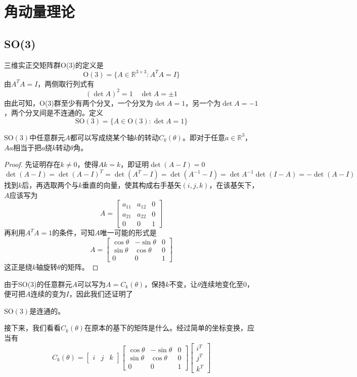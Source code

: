 \section{角动量理论}
\subsection{SO(3)}
三维实正交矩阵群O(3)的定义是
$$\mathrm{O}(3)=\{A\in\mathbb{R}^{3\times 3}:A^TA=I\}$$
由$A^TA=I$，两侧取行列式有
$$(\det A)^2=1\quad \det A=\pm 1$$
由此可知，O(3)群至少有两个分叉，一个分叉为$\det A=1$，另一个为$\det A=-1$，两个分叉间是不连通的。定义
$$\mathrm{SO}(3)=\{A\in\mathrm{O}(3):\det A=1\}$$
\begin{theorem}
    $\mathrm{SO}(3)$中任意群元$A$都可以写成绕某个轴$k$的转动$C_k(\theta)$。即对于任意$a\in\mathbb{R}^3$，$Aa$相当于把$a$绕$k$转动$\theta$角。
\end{theorem}
\begin{proof}
    先证明存在$k\neq 0$，使得$Ak=k$，即证明$\det(A-I)=0$
    $$\det(A-I)=\det(A-I)^T=\det(A^T-I)=\det(A^{-1}-I)=\det A^{-1}\det(I-A)=-\det(A-I)$$
    找到$k$后，再选取两个与$k$垂直的向量，使其构成右手基矢$(i,j,k)$，在该基矢下，$A$应该写为
    $$A=\left[\begin{array}{ccc}
        a_{11}&a_{12}&0\\
        a_{21}&a_{22}&0\\
        0&0&1
    \end{array}\right]$$
    再利用$A^TA=1$的条件，可知$A$唯一可能的形式是
    $$A=\left[\begin{array}{ccc}
        \cos\theta&-\sin\theta&0\\
        \sin\theta&\cos\theta&0\\
        0&0&1
    \end{array}\right]$$
    这正是绕$k$轴旋转$\theta$的矩阵。
\end{proof}
由于SO(3)的任意群元$A$可以写为$A=C_k(\theta)$，保持$k$不变，让$\theta$连续地变化至0，便可把$A$连续的变为$I$，因此我们还证明了
\begin{theorem}
    $\mathrm{SO}(3)$是连通的。
\end{theorem}
接下来，我们看看$C_k(\theta)$在原本的基下的矩阵是什么。经过简单的坐标变换，应当有
$$C_k(\theta)=\left[\begin{array}{ccc}
    i&j&k
\end{array}\right]\left[\begin{array}{ccc}
        \cos\theta&-\sin\theta&0\\
        \sin\theta&\cos\theta&0\\
        0&0&1
    \end{array}\right]\left[\begin{array}{c}
    i^T\\
    j^T\\
    k^T
\end{array}\right]$$
